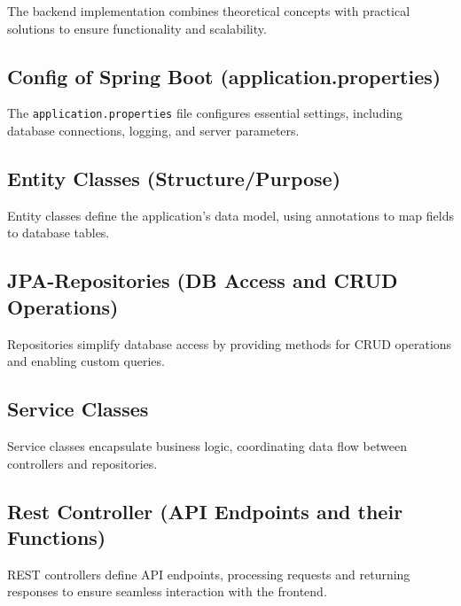 \Author{\daAuthorThree}

    The backend implementation combines theoretical concepts with practical solutions to ensure functionality and scalability.

    \subsection{Config of Spring Boot (application.properties)}
    The \texttt{application.properties} file configures essential settings, including database connections, logging, and server parameters.

    \subsection{Entity Classes (Structure/Purpose)}
    Entity classes define the application's data model, using annotations to map fields to database tables.

    \subsection{JPA-Repositories (DB Access and CRUD Operations)}
    Repositories simplify database access by providing methods for CRUD operations and enabling custom queries.

    \subsection{Service Classes}
    Service classes encapsulate business logic, coordinating data flow between controllers and repositories.

    \subsection{Rest Controller (API Endpoints and their Functions)}
    REST controllers define API endpoints, processing requests and returning responses to ensure seamless interaction with the frontend.
